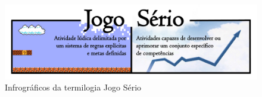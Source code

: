 



\pagebreak

\begin{figure}[htb]

	\caption{\label{fig:JS}Infrográficos da termilogia Jogo Sério}\vspace{-0,5cm}
  \begin{center}
    \includegraphics[width=\linewidth]{./Figuras/JogoSerio.pdf}
	\end{center} \vspace{-0,9cm}

\end{figure}

